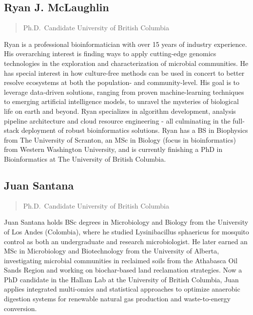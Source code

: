\documentclass[
]{book}
\begin{document}
\subsection{Ryan J. McLaughlin}\label{ryan-j.-mclaughlin}

\begin{quote}
Ph.D.~Candidate
University of British Columbia
\end{quote}

Ryan is a professional bioinformatician with over 15 years of industry experience. His overarching interest is finding ways to apply cutting-edge genomics technologies in the exploration and characterization of microbial communities. He has special interest in how culture-free methods can be used in concert to better resolve ecosystems at both the population- and community-level. His goal is to leverage data-driven solutions, ranging from proven machine-learning techniques to emerging artificial intelligence models, to unravel the mysteries of biological life on earth and beyond. Ryan specializes in algorithm development, analysis pipeline architecture and cloud resource engineering - all culminating in the full-stack deployment of robust bioinformatics solutions. Ryan has a BS in Biophysics from The University of Scranton, an MSc in Biology (focus in bioinformatics) from Western Washington University, and is currently finishing a PhD in Bioinformatics at The University of British Columbia.

\subsection{Juan Santana}\label{juan-santana}

\begin{quote}
Ph.D.~Candidate
University of British Columbia
\end{quote}

Juan Santana holds BSc degrees in Microbiology and Biology from the University of Los Andes (Colombia), where he studied Lysinibacillus sphaericus for mosquito control as both an undergraduate and research microbiologist. He later earned an MSc in Microbiology and Biotechnology from the University of Alberta, investigating microbial communities in reclaimed soils from the Athabasca Oil Sands Region and working on biochar-based land reclamation strategies. Now a PhD candidate in the Hallam Lab at the University of British Columbia, Juan applies integrated multi-omics and statistical approaches to optimize anaerobic digestion systems for renewable natural gas production and waste-to-energy conversion.
\end{document}
